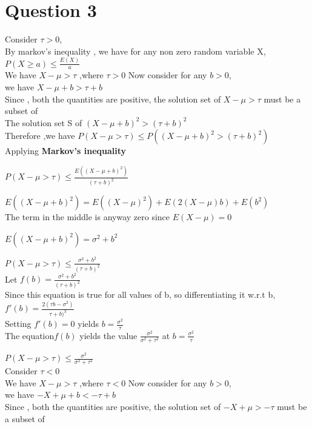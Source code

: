 \documentclass{article}
\begin{document}
\section*{Question 3}
    Consider $\tau > 0$,\\
    By markov's inequality , we have for any non zero random variable X,\\
    $P(X \geq a) \leq \frac{E(X)}{a}$\\
    We have $X - \mu > \tau $ ,where $\tau > 0 $
    Now consider for any $b > 0$,\\
    we have $X- \mu + b > \tau + b$\\
    Since , both the quantities are positive, the solution set of $X- \mu > \tau $ must be a subset of\\
    The solution set S of ${(X-\mu + b)}^2 > {(\tau +b)}^2$\\
    Therefore ,we have $P(X - \mu > \tau ) \leq P({(X-\mu + b)}^2 > {(\tau +b)}^2)$\\
    Applying \textbf{Markov's inequality}\par 
    $P(X - \mu > \tau ) \leq \frac{E({(X-\mu + b)}^2)}{{(\tau +b)}^2}$\par 
    $E({(X-\mu + b)}^2) = E({(X-\mu)}^2) + E(2(X-\mu)b) + E(b^2)$\\
    The term in the middle is anyway zero since $E(X-\mu) = 0 $\par 
    $E({(X-\mu + b)}^2) = \sigma^2 + b^2$\par 
    $P(X - \mu > \tau ) \leq \frac{\sigma^2 + b^2}{{(\tau +b)}^2}$\\
    Let $f(b) = \frac{\sigma^2 + b^2}{{(\tau +b)}^2}$\\
    Since this equation is true for all values of b, so differentiating it w.r.t b,\\
    $f'(b) = \frac{2(\tau b -\sigma^2)}{{\tau +b)}^3}$\\
    Setting $f'(b) = 0 $ yields $b = \frac{\sigma^2}{\tau}$\\
    The equation$f(b)$ yields the value $\frac{\sigma^2}{\sigma^2 +\tau^2}$ at $b =\frac{\sigma^2}{\tau} $\par
    $P(X - \mu > \tau ) \leq \frac{\sigma^2}{\sigma^2 +\tau^2}$\\
    \hline
    Consider $\tau < 0 $\\
    We have $X - \mu > \tau $ ,where $\tau < 0 $
    Now consider for any $b > 0$,\\
    we have $-X+\mu + b < -\tau + b$\\
    Since , both the quantities are positive, the solution set of $-X+\mu > -\tau $ must be a subset of\\
\end{document}
